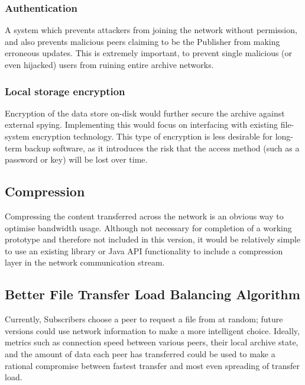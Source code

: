 \documentclass[12pt,a4paper,]{adreport}
\begin{document}
\subsubsection{Authentication}\label{authentication}

A system which prevents attackers from joining the network without permission, and also prevents malicious peers claiming to be the Publisher from making erroneous updates. This is extremely important, to prevent single malicious (or even hijacked) users from ruining entire archive networks.

\subsubsection{Local storage encryption}\label{local-storage-encryption}

Encryption of the data store on-disk would further secure the archive against external spying. Implementing this would focus on interfacing with existing file-system encryption technology. This type of encryption is less desirable for long-term backup software, as it introduces the risk that the access method (such as a password or key) will be lost over time.

\subsection{Compression}\label{compression}

Compressing the content transferred across the network is an obvious way to optimise bandwidth usage. Although not necessary for completion of a working prototype and therefore not included in this version, it would be relatively simple to use an existing library or Java API functionality to include a compression layer in the network communication stream.

\subsection{Better File Transfer Load Balancing
Algorithm}\label{better-file-transfer-load-balancing-algorithm}

Currently, Subscribers choose a peer to request a file from at random; future versions could use network information to make a more intelligent choice. Ideally, metrics such as connection speed between various peers, their local archive state, and the amount of data each peer has transferred could be used to make a rational compromise between fastest transfer and most even spreading of transfer load.
\end{document}
